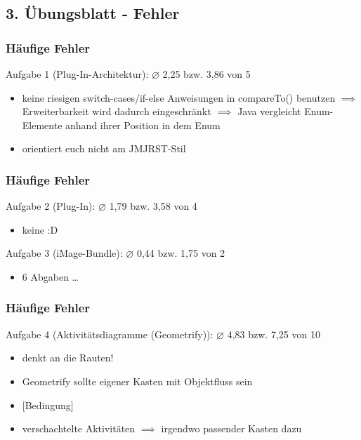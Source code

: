 \documentclass[18pt]{beamer}
\begin{document}
	\subsection{3. Übungsblatt - Fehler}
	\begin{frame}
		\frametitle{Häufige Fehler}
		\begin{block}{Aufgabe 1 (Plug-In-Architektur): $\diameter$  2,25 bzw. 3,86 von 5}
			\begin{itemize}
				\pause
				\item keine riesigen switch-cases/if-else Anweisungen in compareTo() benutzen
				\linebreak $\implies$ Erweiterbarkeit wird dadurch eingeschränkt \pause
				\linebreak $\implies$ Java vergleicht Enum-Elemente anhand ihrer Position in dem Enum \pause
				\item orientiert euch nicht am JMJRST-Stil
			\end{itemize}
		\end{block}
	\end{frame}

	\begin{frame}
		\frametitle{Häufige Fehler}
		\begin{block}{Aufgabe 2 (Plug-In): $\diameter$ 1,79 bzw. 3,58 von 4}
			\begin{itemize}
				\item 	keine :D
			\end{itemize}
		\end{block}
		\begin{block}{Aufgabe 3 (iMage-Bundle): $\diameter$  0,44 bzw. 1,75 von 2}
			\begin{itemize}
				\item 6 Abgaben \dots
			\end{itemize}
		\end{block}
	\end{frame}

	\begin{frame}
		\frametitle{Häufige Fehler}
		\begin{block}{Aufgabe 4 (Aktivitätsdiagramme (Geometrify)): $\diameter$ 4,83 bzw. 7,25 von 10}
			\begin{itemize}
				\pause 
				\item denkt an die Rauten! \pause
				\item Geometrify sollte eigener Kasten mit Objektfluss sein \pause
				\item $\lbrack$Bedingung$\rbrack$ \pause
				\item verschachtelte Aktivitäten $\implies$ irgendwo passender Kasten dazu
			\end{itemize}
		\end{block}
	\end{frame}
\end{document}
